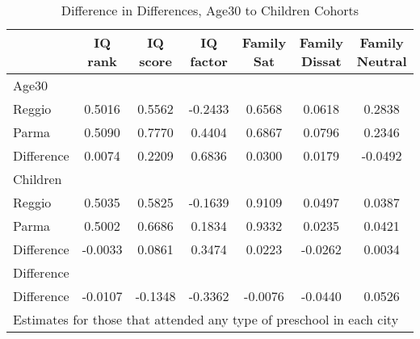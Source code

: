 \begin{table}[htbp]\centering
\caption{Difference in Differences, Age30 to Children Cohorts}
\begin{tabular}{l*{6}{c}}
\hline\hline
            &     IQ rank&    IQ score&   IQ factor&  Family Sat&Family Dissat&Family Neutral\\
\hline
Age30       &            &            &            &            &            &            \\
Reggio      &      0.5016&      0.5562&     -0.2433&      0.6568&      0.0618&      0.2838\\
Parma       &      0.5090&      0.7770&      0.4404&      0.6867&      0.0796&      0.2346\\
Difference  &      0.0074&      0.2209&      0.6836&      0.0300&      0.0179&     -0.0492\\
\hline
Children    &            &            &            &            &            &            \\
Reggio      &      0.5035&      0.5825&     -0.1639&      0.9109&      0.0497&      0.0387\\
Parma       &      0.5002&      0.6686&      0.1834&      0.9332&      0.0235&      0.0421\\
Difference  &     -0.0033&      0.0861&      0.3474&      0.0223&     -0.0262&      0.0034\\
\hline
Difference  &            &            &            &            &            &            \\
Difference  &     -0.0107&     -0.1348&     -0.3362&     -0.0076&     -0.0440&      0.0526\\
\hline\hline
\multicolumn{7}{l}{\footnotesize Estimates for those that attended any type of preschool in each city}\\
\end{tabular}
\end{table}
